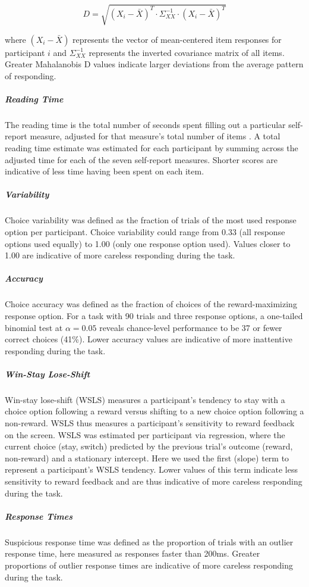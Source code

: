 \documentclass[a4paper,notitlepage,12pt]{article}
\begin{document}
\begin{equation*}
    D = \sqrt{(X_i - \bar{X})^T \cdot \Sigma^{-1}_{XX} \cdot (X_i - \bar{X})^T }
\end{equation*}

where $(X_i - \bar{X})$ represents the vector of mean-centered item responses for participant $i$ and $\Sigma^{-1}_{XX}$ represents the inverted covariance matrix of all items. Greater Mahalanobis D values indicate larger deviations from the average pattern of responding.

\subparagraph{Reading Time} The reading time is the total number of seconds spent filling out a particular self-report measure, adjusted for that measure's total number of items \cite{ophir2020turker}. A total reading time estimate was estimated for each participant by summing across the adjusted time for each of the seven self-report measures. Shorter scores are indicative of less time having been spent on each item.

\subparagraph{Variability} Choice variability was defined as the fraction of trials of the most used response option per participant. Choice variability could range from 0.33 (all response options used equally) to 1.00 (only one response option used). Values closer to 1.00 are indicative of more careless responding during the task.  

\subparagraph{Accuracy} Choice accuracy was defined as the fraction of choices of the reward-maximizing response option. For a task with 90 trials and three response options, a one-tailed binomial test at $\alpha=0.05$ reveals chance-level performance to be 37 or fewer correct choices (41\%). Lower accuracy values are indicative of more inattentive responding during the task.

\subparagraph{Win-Stay Lose-Shift} Win-stay lose-shift (WSLS) measures a participant's tendency to stay with a choice option following a reward versus shifting to a new choice option following a non-reward. WSLS thus measures a participant's sensitivity to reward feedback on the screen. WSLS was estimated per participant via regression, where the current choice (stay, switch) predicted by the previous trial's outcome (reward, non-reward) and a stationary intercept. Here we used the first (slope) term to represent a participant's WSLS tendency. Lower values of this term indicate less sensitivity to reward feedback and are thus indicative of more careless responding during the task.

\subparagraph{Response Times} Suspicious response time was defined as the proportion of trials with an outlier response time, here measured as responses faster than 200ms. Greater proportions of outlier response times are indicative of more careless responding during the task.  
\end{document}
